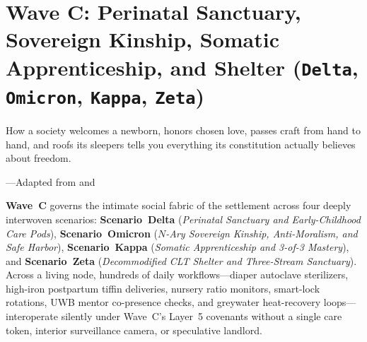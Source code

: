 \chapter{Wave C: Perinatal Sanctuary, Sovereign Kinship, Somatic Apprenticeship, and Shelter (\texttt{Delta}, \texttt{Omicron}, \texttt{Kappa}, \texttt{Zeta})}
\label{ch:l5-wave-c}

\epigraph{How a society welcomes a newborn, honors chosen love, passes craft from hand to hand, and roofs its sleepers tells you everything its constitution actually believes about freedom.}{---Adapted from \textcite{arendt1963} and \textcite{habraken1972supports}}

\textbf{Wave~C} governs the intimate social fabric of the settlement across four deeply interwoven
scenarios: \textbf{Scenario~Delta} (\textit{Perinatal Sanctuary and Early-Childhood Care Pods}),
\textbf{Scenario~Omicron} (\textit{$N$-Ary Sovereign Kinship, Anti-Moralism, and Safe Harbor}),
\textbf{Scenario~Kappa} (\textit{Somatic Apprenticeship and 3-of-3 Mastery}), and
\textbf{Scenario~Zeta} (\textit{Decommodified CLT Shelter and Three-Stream Sanctuary}). Across a
living node, hundreds of daily workflows---diaper autoclave sterilizers, high-iron postpartum tiffin
deliveries, nursery ratio monitors, smart-lock rotations, UWB mentor co-presence checks, and
greywater heat-recovery loops---interoperate silently under Wave~C's Layer~5 covenants without a
single care token, interior surveillance camera, or speculative landlord.

